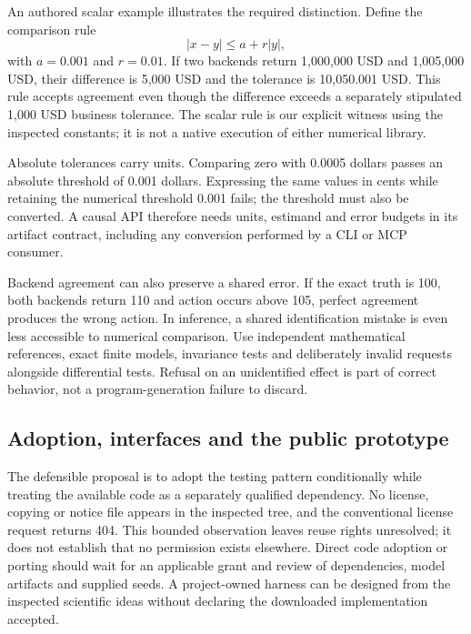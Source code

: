 An authored scalar example illustrates the required distinction. Define the comparison rule
\[
 |x-y|\leq a+r|y|,
\]
with $a=0.001$ and $r=0.01$. If two backends return 1,000,000 USD and 1,005,000 USD, their difference is 5,000 USD and the tolerance is 10,050.001 USD. This rule accepts agreement even though the difference exceeds a separately stipulated 1,000 USD business tolerance. The scalar rule is our explicit witness using the inspected constants; it is not a native execution of either numerical library.~\citep{exec24_affordance_fuzzing_reference}

Absolute tolerances carry units. Comparing zero with 0.0005 dollars passes an absolute threshold of 0.001 dollars. Expressing the same values in cents while retaining the numerical threshold 0.001 fails; the threshold must also be converted. A causal API therefore needs units, estimand and error budgets in its artifact contract, including any conversion performed by a CLI or MCP consumer.~\citep{exec24_affordance_fuzzing_reference}

Backend agreement can also preserve a shared error. If the exact truth is 100, both backends return 110 and action occurs above 105, perfect agreement produces the wrong action. In inference, a shared identification mistake is even less accessible to numerical comparison. Use independent mathematical references, exact finite models, invariance tests and deliberately invalid requests alongside differential tests. Refusal on an unidentified effect is part of correct behavior, not a program-generation failure to discard.~\citep{exec24_affordance_fuzzing_reference}

\subsection{Adoption, interfaces and the public prototype}
The defensible proposal is to adopt the testing pattern conditionally while treating the available code as a separately qualified dependency. No license, copying or notice file appears in the inspected tree, and the conventional license request returns 404. This bounded observation leaves reuse rights unresolved; it does not establish that no permission exists elsewhere. Direct code adoption or porting should wait for an applicable grant and review of dependencies, model artifacts and supplied seeds. A project-owned harness can be designed from the inspected scientific ideas without declaring the downloaded implementation accepted.~\citep{exec24_titanfuzz_source,exec24_affordance_fuzzing_reference}

